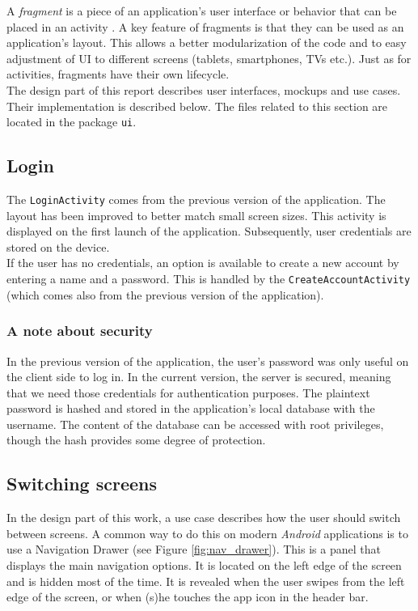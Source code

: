 \documentclass[a4paper, oneside, 11pt]{book}
\begin{document}
A \emph{fragment} is a piece of an application's user interface or behavior that can be placed in an activity \cite{fragment:online}. A key feature of fragments is that they can be used as an application's layout. This allows a better modularization of the code and to easy adjustment of  UI to different screens (tablets, smartphones, TVs etc.). Just as for activities, fragments have their own lifecycle.\\

The design part of this report describes user interfaces, mockups and use cases. Their implementation is described below. The files related to this section are located in the package \texttt{ui}.

\subsection{Login}
The \texttt{LoginActivity} comes from the previous version of the application. The layout has been improved to better match small screen sizes. This activity is displayed on the first launch of the application. Subsequently, user credentials are stored on the device.\\

If the user has no credentials, an option is available to create a new account by entering a name and a password. This is handled by the \texttt{CreateAccountActivity} (which comes also from the previous version of the application).

\subsubsection{A note about security}
In the previous version of the application, the user’s password was only useful on the client side to log in. In the current version, the server is secured, meaning that we need those credentials for authentication purposes. The plaintext password is hashed and stored in the application’s local database with the username. The content of the database can be accessed with root privileges, though the hash provides some degree of protection.

\subsection{Switching screens}
In the design part of this work, a use case describes how the user should switch between screens. A common way to do this on modern \textit{Android} applications is to use a Navigation Drawer (see Figure \ref{fig:nav_drawer}).  This is a panel that displays the main navigation options. It is located on the left edge of the screen and is hidden most of the time. It is revealed when the user swipes from the left edge of the screen, or when (s)he touches the app icon in the header bar.
\end{document}
